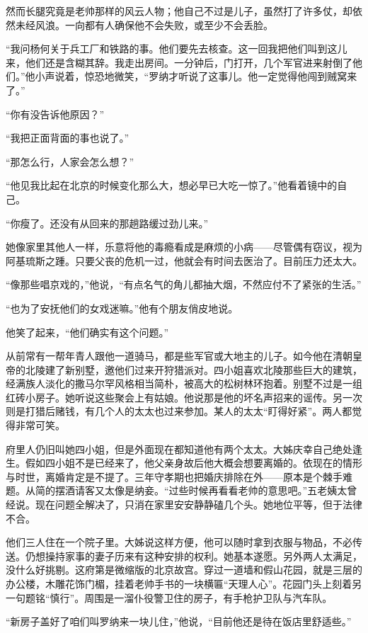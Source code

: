\par 然而长腿究竟是老帅那样的风云人物；他自己不过是儿子，虽然打了许多仗，却依然未经风浪。一向都有人确保他不会失败，或至少不会丢脸。
\par “我问杨何关于兵工厂和铁路的事。他们要先去核查。这一回我把他们叫到这儿来，他们还是含糊其辞。我走出房间。一分钟后，门打开，几个军官进来射倒了他们。”他小声说着，惊恐地微笑，“罗纳才听说了这事儿。他一定觉得他闯到贼窝来了。”
\par “你有没告诉他原因？”
\par “我把正面背面的事也说了。”
\par “那怎么行，人家会怎么想？”
\par “他见我比起在北京的时候变化那么大，想必早已大吃一惊了。”他看着镜中的自己。
\par “你瘦了。还没有从回来的那趟路缓过劲儿来。”
\par 她像家里其他人一样，乐意将他的毒瘾看成是麻烦的小病——尽管偶有窃议，视为阿基琉斯之踵。只要父丧的危机一过，他就会有时间去医治了。目前压力还太大。
\par “像那些唱京戏的，”他说，“有点名气的角儿都抽大烟，不然应付不了紧张的生活。”
\par “也为了安抚他们的女戏迷嘛。”他有个朋友俏皮地说。
\par 他笑了起来，“他们确实有这个问题。”
\par 从前常有一帮年青人跟他一道骑马，都是些军官或大地主的儿子。如今他在清朝皇帝的北陵建了新别墅，邀他们过来开狩猎派对。四小姐喜欢北陵那些巨大的建筑，经满族人淡化的撒马尔罕风格相当简朴，被高大的松树林环抱着。别墅不过是一组红砖小房子。她听说这些聚会上有姑娘。他说那是他的坏名声招来的谣传。另一次则是打猎后赌钱，有几个人的太太也过来参加。某人的太太“盯得好紧”。两人都觉得非常可笑。
\par 府里人仍旧叫她四小姐，但是外面现在都知道他有两个太太。大姊庆幸自己绝处逢生。假如四小姐不是已经来了，他父亲身故后他大概会想要离婚的。依现在的情形与时世，离婚肯定是不提了。三年守孝期也把婚庆排除在外——原本是个棘手难题。从简的摆酒请客又太像是纳妾。“过些时候再看看老帅的意思吧。”五老姨太曾经说。现在问题全解决了，只消在家里安安静静磕几个头。她地位平等，但于法律不合。
\par 他们三人住在一个院子里。大姊说这样方便，他可以随时拿到衣服与物品，不必传送。仍想操持家事的妻子历来有这种安排的权利。她基本遂愿。另外两人太满足，没什么好挑剔。这府第是微缩版的北京故宫。穿过一道墙和假山花园，就是三层的办公楼，木雕花饰门楣，挂着老帅手书的一块横匾“天理人心”。花园门头上刻着另一句题铭“慎行”。周围是一溜仆役警卫住的房子，有手枪护卫队与汽车队。
\par “新房子盖好了咱们叫罗纳来一块儿住，”他说，“目前他还是待在饭店里舒适些。”
